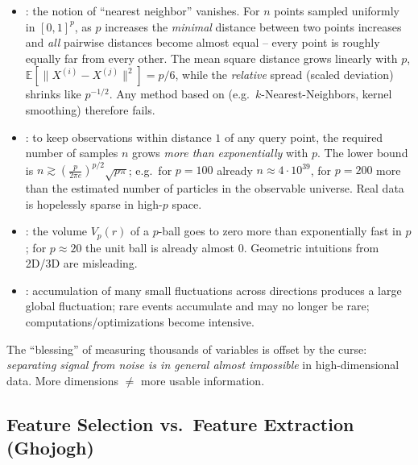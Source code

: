 \begin{itemize}
\item {}: the notion of ``nearest neighbor'' vanishes.
      For $n$ points sampled uniformly in $[0,1]^p$, as $p$ increases the
      \emph{minimal} distance between two points increases and \emph{all}
      pairwise distances become almost equal -- every point is roughly equally
      far from every other. The mean square distance grows linearly with $p$,
      $\mathbb{E}\!\left[\lVert X^{(i)}-X^{(j)}\rVert^2\right]=p/6$, while the
      \emph{relative} spread (scaled deviation) shrinks like $p^{-1/2}$. Any
      method based on  (e.g.\ $k$-Nearest-Neighbors,
      kernel smoothing) therefore fails.
\item {}: to keep observations within distance $1$ of any query
      point, the required number of samples $n$ grows \emph{more than
      exponentially} with $p$. The lower bound is
      $n \gtrsim \left(\tfrac{p}{2\pi e}\right)^{p/2}\!\sqrt{p\pi}$; e.g.\ for
      $p=100$ already $n \approx 4\cdot10^{39}$, for $p=200$ more than the
      estimated number of particles in the observable universe. Real data is
      hopelessly sparse in high-$p$ space.
\item {}: the volume $V_p(r)$ of a $p$-ball goes to zero
      more than exponentially fast in $p$; for $p\approx20$ the unit ball is
      already almost $0$. Geometric intuitions from 2D/3D are misleading.
\item {}: accumulation of many small fluctuations
      across directions produces a large global fluctuation; rare events
      accumulate and may no longer be rare; computations/optimizations become
      intensive.
\end{itemize}

\begin{pitfall}
The ``blessing'' of measuring thousands of variables is offset by the curse:
\emph{separating signal from noise is in general almost impossible} in
high-dimensional data. More dimensions $\neq$ more usable information.
\end{pitfall}

\subsection{Feature Selection vs.\ Feature Extraction (Ghojogh)}

